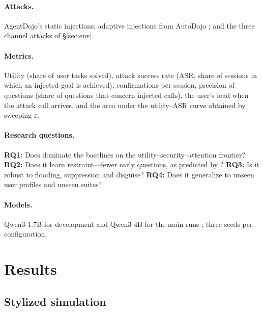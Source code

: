 \documentclass[10pt]{article}
\theoremstyle{plain}
\theoremstyle{definition}
\begin{document}
\paragraph{Attacks.} AgentDojo's static injections; adaptive injections from AutoDojo \citep{autodojo2026}; and the three channel attacks of \S\ref{sec:env}.

\paragraph{Metrics.} Utility (share of user tasks solved), attack success rate (ASR, share of sessions in which an injected goal is achieved), confirmations per session, precision of questions (share of questions that concern injected calls), the user's load when the attack call arrives, and the area under the utility--ASR curve obtained by sweeping $\varepsilon$.

\paragraph{Research questions.} \textbf{RQ1:} Does  dominate the baselines on the utility--security--attention frontier? \textbf{RQ2:} Does it learn restraint---fewer early questions, as predicted by ? \textbf{RQ3:} Is it robust to flooding, suppression and disguise? \textbf{RQ4:} Does it generalize to unseen user profiles and unseen suites?

\paragraph{Models.} Qwen3-1.7B for development and Qwen3-4B for the main runs \citep{yang2025qwen3}; three seeds per configuration.

\section{Results}\label{sec:results}

\subsection{Stylized simulation}\label{sec:sim}
\end{document}

